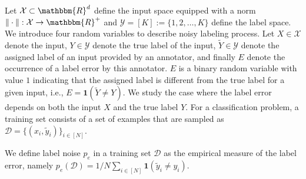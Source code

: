     Let $\mathcal{X} \subset \mathbbm{R}^d$ define the input space equipped with a norm $\|\cdot\|: \mathcal{X} \rightarrow \mathbbm{R}^+$ 
    and $\mathcal{Y} = [K] := \{1, 2,\ldots, K\}$ define the label space. 
    We introduce four random variables to describe noisy labeling process.
    Let $X \in \mathcal{X}$ denote the input, $Y \in \mathcal{Y}$ denote the true label of the input, $\tilde{Y} \in \mathcal{Y}$ denote the assigned label of an input provided by an annotator, and finally $E$ denote the occurrence of a label error by this annotator. $E$ is a binary random variable with value $1$ indicating that the assigned label is different from the true label for a given input, i.e., $E = \mathbf{1}(\tilde{Y} \ne Y)$. We study the case where the label error depends on both the input $X$ and the true label $Y$. 
    For a classification problem, a training set consists of a set of examples that are sampled as $\mathcal{D} =\{(x_i, \tilde{y}_i)\}_{i\in[N]}$. %
    
    \begin{definition}
    \label{definition:implicit-label-noise}
     We define label noise $p_e$ in a training set $\mathcal{D}$ as the empirical measure of the label error, namely $p_e(\mathcal{D}) = 1/N \sum_{i\in [N]} \mathbf{1}(\tilde{y}_i \ne y_i)$. %
    \end{definition}
    
